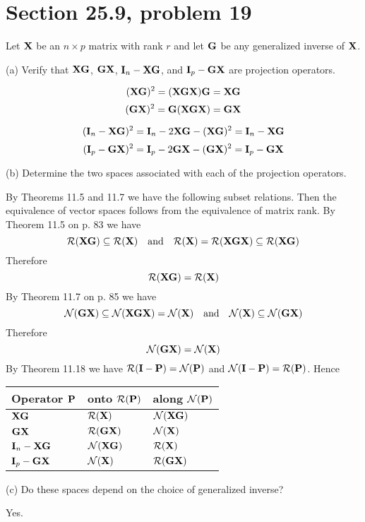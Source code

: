 \section{Section 25.9, problem 19}
Let $\bf X$ be an $n\times p$ matrix with rank $r$ and let $\bf G$
be any generalized inverse of $\bf X$.

\bigskip
\noindent
(a) Verify that $\bf XG$, $\bf GX$, ${\bf I}_n-\bf XG$, and
${\bf I}_p-\bf GX$ are projection operators.

$$({\bf XG})^2=({\bf XGX}){\bf G}={\bf XG}$$
$$({\bf GX})^2={\bf G}({\bf XGX})={\bf GX}$$

$$({\bf I}_n-{\bf XG})^2={\bf I}_n-2{\bf XG}-({\bf XG})^2
={\bf I}_n-{\bf XG}$$
$$({\bf I}_p-{\bf GX})^2={\bf I}_p-2{\bf GX}-({\bf GX})^2
={\bf I}_p-{\bf GX}$$

\bigskip
\noindent
(b) Determine the two spaces associated with each of the
projection operators.

\bigskip
\noindent
By Theorems 11.5 and 11.7 we have the following subset relations.
Then the equivalence of vector spaces follows from the equivalence
of matrix rank.
%
%
By Theorem 11.5 on p. 83 we have
$${\cal R}({\bf XG})\subseteq{\cal R}({\bf X})\quad\hbox{and}\quad
{\cal R}({\bf X})={\cal R}({\bf XGX})\subseteq{\cal R}({\bf XG})$$
Therefore
$${\cal R}({\bf XG})={\cal R}({\bf X})$$
%
By Theorem 11.7 on p. 85 we have
$${\cal N}({\bf GX})\subseteq{\cal N}({\bf XGX})={\cal N}({\bf X})
\quad\hbox{and}\quad
{\cal N}({\bf X})\subseteq{\cal N}({\bf GX})$$
Therefore
$${\cal N}({\bf GX})={\cal N}({\bf X})$$
By Theorem 11.18 we have 
${\cal R}({\bf I}-{\bf P})={\cal N}({\bf P})$
and
${\cal N}({\bf I}-{\bf P})={\cal R}({\bf P})$.
Hence

\begin{center}
\begin{tabular}{|l|l|l|}
\hline
Operator $\bf P$ & onto ${\cal R}({\bf P})$ & along ${\cal N}({\bf P})$\\
\hline
${\bf XG}$ & ${\cal R}({\bf X})$ & ${\cal N}({\bf XG})$\\
${\bf GX}$ & ${\cal R}({\bf GX})$ & ${\cal N}({\bf X})$\\
${\bf I}_n-\bf XG$ & ${\cal N}({\bf XG})$ & ${\cal R}({\bf X})$\\
${\bf I}_p-\bf GX$ & ${\cal N}({\bf X})$ & ${\cal R}({\bf GX})$\\
\hline
\end{tabular}
\end{center}

\bigskip
\noindent
(c) Do these spaces depend on the choice of generalized inverse?

\bigskip
\noindent
Yes.

